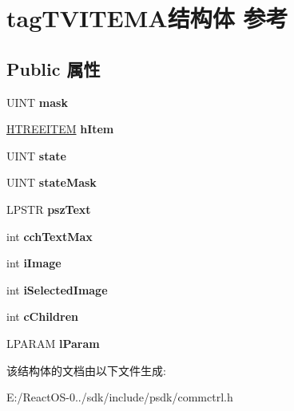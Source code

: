 \hypertarget{structtag_t_v_i_t_e_m_a}{}\section{tag\+T\+V\+I\+T\+E\+M\+A结构体 参考}
\label{structtag_t_v_i_t_e_m_a}
\subsection*{Public 属性}
\begin{DoxyCompactItemize}
\item 
\mbox{\label{structtag_t_v_i_t_e_m_a_a01e172008bf3721e8702cee29f50c1eb}} 
U\+I\+NT {\bfseries mask}
\item 
\mbox{\label{structtag_t_v_i_t_e_m_a_ae138ac28fd2d935d543bc75930d7ea61}} 
\hyperlink{struct___t_r_e_e_i_t_e_m}{H\+T\+R\+E\+E\+I\+T\+EM} {\bfseries h\+Item}
\item 
\mbox{\label{structtag_t_v_i_t_e_m_a_ac5538b836da8bb768ca8b2212ea9c5d7}} 
U\+I\+NT {\bfseries state}
\item 
\mbox{\label{structtag_t_v_i_t_e_m_a_ab7500690a302a3efb148dadf9c74cde9}} 
U\+I\+NT {\bfseries state\+Mask}
\item 
\mbox{\label{structtag_t_v_i_t_e_m_a_a6d44bec4233bd5585c331b99bc95c6c7}} 
L\+P\+S\+TR {\bfseries psz\+Text}
\item 
\mbox{\label{structtag_t_v_i_t_e_m_a_ae96226b3a039a26adb57f7842384395e}} 
int {\bfseries cch\+Text\+Max}
\item 
\mbox{\label{structtag_t_v_i_t_e_m_a_a853cedbc259721b0d0f50040411213ca}} 
int {\bfseries i\+Image}
\item 
\mbox{\label{structtag_t_v_i_t_e_m_a_a8e1847a3af82adfb179aed91d3f8010b}} 
int {\bfseries i\+Selected\+Image}
\item 
\mbox{\label{structtag_t_v_i_t_e_m_a_a9b0bfa0fc61473b06fa227f5d5cbf3b9}} 
int {\bfseries c\+Children}
\item 
\mbox{\label{structtag_t_v_i_t_e_m_a_a66192fb0645b16eadee790539b6dfcf9}} 
L\+P\+A\+R\+AM {\bfseries l\+Param}
\end{DoxyCompactItemize}


该结构体的文档由以下文件生成\+:\begin{DoxyCompactItemize}
\item 
E\+:/\+React\+O\+S-\/0../sdk/include/psdk/commctrl.\+h\end{DoxyCompactItemize}
